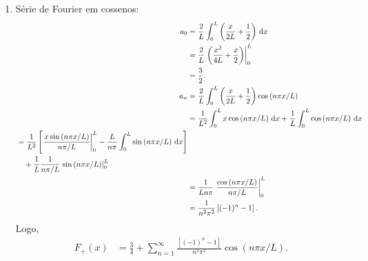 \begin{exem}
\begin{enumerate}
        \item S\'{e}rie de Fourier em cossenos:
            \begin{align*}
                a_0 &= \frac{2}{L} \int_0^L \left( \frac{x}{2L} + \frac{1}{2} \right) \, \mathrm{d}x \\
                &= \frac{2}{L} \left. \left( \frac{x^2}{4 L} + \frac{x}{2} \right) \right|_0^L \\
                &= \frac{3}{2}. \\
                a_n &= \frac{2}{L} \int_0^L \left( \frac{x}{2L} + \frac{1}{2} \right) \cos\left( n \pi x / L \right) \\
                &= \frac{1}{L^2} \int_0^L x \cos\left( n \pi x / L \right) \, \mathrm{d}x + \frac{1}{L} \int_0^L \cos\left( n \pi x / L \right) \, \mathrm{d}x \\
                \begin{split}
                    &= \frac{1}{L^2} \left[ \left. \frac{x \sin\left( n \pi x / L \right)}{n \pi / L} \right|_0^L - \frac{L}{n \pi} \int_0^L \sin\left( n \pi x / L \right) \, \mathrm{d}x \right] \\
                    &\quad {}+ \frac{1}{L} \frac{1}{n \pi / L} \left. \sin\left( n \pi x / L \right) \right|_0^L
                \end{split} \\
                &= \frac{1}{L n \pi} \left. \frac{\cos\left( n \pi x / L \right)}{n \pi / L} \right|_0^L \\
                &= \frac{1}{n^2 \pi^2} \left[ (-1)^n - 1 \right].
            \end{align*}
            Logo,
            \begin{align*}
                F_+(x) &= \frac{3}{4} + \sum_{n = 1}^\infty \frac{\left[ (-1)^n - 1 \right]}{n^2 \pi^2} \cos\left( n \pi x / L \right).
            \end{align*}
    \end{enumerate}
\end{exem}

